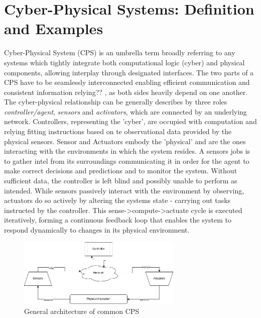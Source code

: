 \section{Cyber-Physical Systems: Definition and Examples}

Cyber-Physical System (CPS) is an umbrella term broadly referring to any systems which tightly integrate both computational logic (cyber) and physical components, allowing interplay
through designated interfaces. \cite{cpsModelDesc} The two parts of a CPS have to be seamlessly interconnected enabling efficient communication and consistent information
relying?? \cite{cpsChallengesAndFuture}, as both sides heavily depend on one another.
The cyber-physical relationship can be generally describes by three roles \textit{controller/agent}, \textit{sensors} and \textit{activators},
which are connected by an underlying network.
Controllers, representing the 'cyber', are occupied with computation and relying fitting instructions based on te observational data provided by the physical sensors.
Sensor and Actuators embody the 'physical' and are the ones interacting with the environments in which the system resides. A sensors jobs is to gather intel from its
surroundings communicating it in order for the agent to make correct decisions and predictions and to monitor the system. Without sufficient data, the controller is left
blind and possibly  unable to perform as intended. While sensors passively interact with the environment by observing, actuators do so actively by altering the systems state
- carrying out tasks instructed by the controller. This sense->compute->actuate cycle is executed iteratively, forming a continuous feedback loop that enables the system to
respond dynamically to changes in its physical environment.

\begin{figure}[htbp]
  \centering
  \includegraphics[width=0.7\textwidth]{graphics/cpsGeneralArchitecture.png}
  \caption{General architecture of common CPS}
  \label{fig:cps_architecture}
\end{figure}


